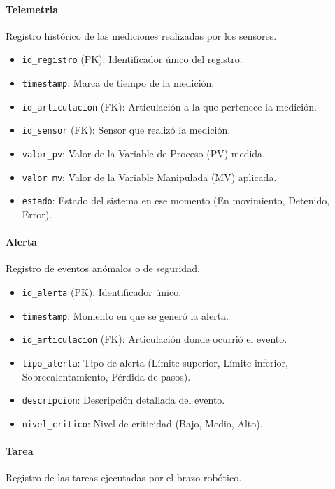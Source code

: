 \documentclass[11pt]{article}
\begin{document}
\paragraph{Telemetria}
Registro histórico de las mediciones realizadas por los sensores.

\begin{itemize}
	\item \texttt{id\_registro} (PK): Identificador único del registro.
	\item \texttt{timestamp}: Marca de tiempo de la medición.
	\item \texttt{id\_articulacion} (FK): Articulación a la que pertenece la medición.
	\item \texttt{id\_sensor} (FK): Sensor que realizó la medición.
	\item \texttt{valor\_pv}: Valor de la Variable de Proceso (PV) medida.
	\item \texttt{valor\_mv}: Valor de la Variable Manipulada (MV) aplicada.
	\item \texttt{estado}: Estado del sistema en ese momento (En movimiento, Detenido, Error).
\end{itemize}

\paragraph{Alerta}
Registro de eventos anómalos o de seguridad.

\begin{itemize}
	\item \texttt{id\_alerta} (PK): Identificador único.
	\item \texttt{timestamp}: Momento en que se generó la alerta.
	\item \texttt{id\_articulacion} (FK): Articulación donde ocurrió el evento.
	\item \texttt{tipo\_alerta}: Tipo de alerta (Límite superior, Límite inferior, Sobrecalentamiento, Pérdida de pasos).
	\item \texttt{descripcion}: Descripción detallada del evento.
	\item \texttt{nivel\_critico}: Nivel de criticidad (Bajo, Medio, Alto).
\end{itemize}

\paragraph{Tarea}
Registro de las tareas ejecutadas por el brazo robótico.
\end{document}
